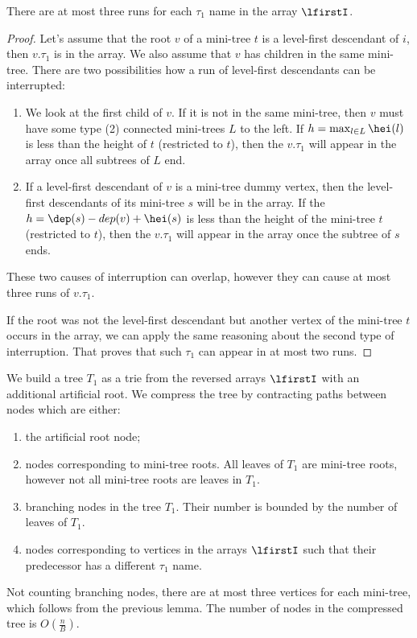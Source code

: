 \begin{lemma}\label{l:level-first-3}
	There are at most three runs for each $\tau_1$ name in the array $\lfirstI$.
\end{lemma}
\begin{proof}
	Let's assume that the root $v$ of a mini-tree $t$ is a level-first descendant of $i$, then $v.\tau_1$ is in the array.
	We also assume that $v$ has children in the same mini-tree.
	There are two possibilities how a run of level-first descendants can be interrupted:
	\begin{enumerate}
		\item We look at the first child of $v$.
		If it is not in the same mini-tree, then $v$ must have some type (2) connected mini-trees $L$ to the left.
		If $h = \max_{l \in L} \hei(l)$ is less than the height of $t$ (restricted to $t$), then the $v.\tau_1$ will appear in the array once all subtrees of $L$ end.
		
		\item If a level-first descendant of $v$ is a mini-tree dummy vertex, then the level-first descendants of its mini-tree $s$ will be in the array.
		If the $h = \dep(s) - dep(v) + \hei(s)$ is less than the height of the mini-tree $t$ (restricted to $t$), then the $v.\tau_1$ will appear in the array once the subtree of $s$ ends.
	\end{enumerate}
	These two causes of interruption can overlap, however they can cause at most three runs of $v.\tau_1$.
	
	If the root was not the level-first descendant but another vertex of the mini-tree $t$ occurs in the array, we can apply the same reasoning about the second type of interruption.
	That proves that such $\tau_1$ can appear in at most two runs.
\end{proof}

\bigbreak

We build a tree $T_1$ as a trie from the reversed arrays $\lfirstI$ with an additional artificial root.
We compress the tree by contracting paths between nodes which are either:
\begin{enumerate}
	\item the artificial root node;
	\item nodes corresponding to mini-tree roots.
	All leaves of $T_1$ are mini-tree roots, however not all mini-tree roots are leaves in $T_1$.
	\item branching nodes in the tree $T_1$.
	Their number is bounded by the number of leaves of $T_1$.
	\item nodes corresponding to vertices in the arrays $\lfirstI$ such that their predecessor has a different $\tau_1$ name.
\end{enumerate}
Not counting branching nodes, there are at most three vertices for each mini-tree, which follows from the previous lemma.
The number of nodes in the compressed tree is $O(\frac{n}{B})$.

